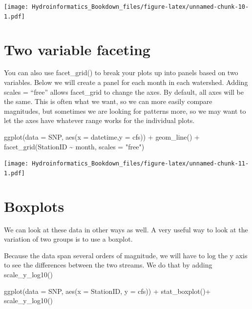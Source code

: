 \documentclass[
]{book}
\newenvironment{Shaded}{\begin{snugshade}}{\end{snugshade}}
\newcommand{\AttributeTok}[1]{\textcolor[rgb]{0.77,0.63,0.00}{#1}}
\newcommand{\FunctionTok}[1]{\textcolor[rgb]{0.00,0.00,0.00}{#1}}
\newcommand{\NormalTok}[1]{#1}
\newcommand{\SpecialCharTok}[1]{\textcolor[rgb]{0.00,0.00,0.00}{#1}}
\newcommand{\StringTok}[1]{\textcolor[rgb]{0.31,0.60,0.02}{#1}}
\begin{document}
\texttt{[image: Hydroinformatics\_Bookdown\_files/figure-latex/unnamed-chunk-10-1.pdf]}

\hypertarget{two-variable-faceting}{%
\section{Two variable faceting}\label{two-variable-faceting}}

You can also use facet\_grid() to break your plots up into panels based on two variables. Below we will create a panel for each month in each watershed. Adding scales = ``free'' allows facet\_grid to change the axes. By default, all axes will be the same. This is often what we want, so we can more easily compare magnitudes, but sometimes we are looking for patterns more, so we may want to let the axes have whatever range works for the individual plots.

\begin{Shaded}
\begin{Highlighting}[]
\FunctionTok{ggplot}\NormalTok{(}\AttributeTok{data =}\NormalTok{ SNP, }\FunctionTok{aes}\NormalTok{(}\AttributeTok{x =}\NormalTok{ datetime,}\AttributeTok{y =}\NormalTok{ cfs)) }\SpecialCharTok{+}
  \FunctionTok{geom\_line}\NormalTok{() }\SpecialCharTok{+}
  \FunctionTok{facet\_grid}\NormalTok{(StationID }\SpecialCharTok{\textasciitilde{}}\NormalTok{ month, }\AttributeTok{scales =} \StringTok{"free"}\NormalTok{)}
\end{Highlighting}
\end{Shaded}

\texttt{[image: Hydroinformatics\_Bookdown\_files/figure-latex/unnamed-chunk-11-1.pdf]}

\hypertarget{boxplots}{%
\section{Boxplots}\label{boxplots}}

We can look at these data in other ways as well. A very useful way to look at the variation of two groups is to use a boxplot.

Because the data span several orders of magnitude, we will have to log the y axis to see the differences between the two streams. We do that by adding scale\_y\_log10()

\begin{Shaded}
\begin{Highlighting}[]
\FunctionTok{ggplot}\NormalTok{(}\AttributeTok{data =}\NormalTok{ SNP, }\FunctionTok{aes}\NormalTok{(}\AttributeTok{x =}\NormalTok{ StationID, }\AttributeTok{y =}\NormalTok{ cfs)) }\SpecialCharTok{+} 
  \FunctionTok{stat\_boxplot}\NormalTok{()}\SpecialCharTok{+}
  \FunctionTok{scale\_y\_log10}\NormalTok{()}
\end{Highlighting}
\end{Shaded}
\end{document}
